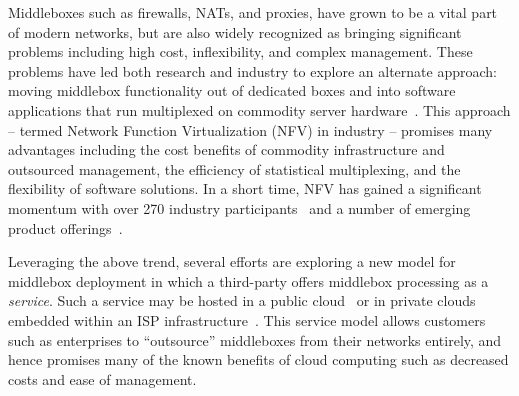 





Middleboxes such as firewalls, NATs, and proxies, have grown to be a vital part of modern networks, but are 
also widely recognized as bringing significant problems including high cost, inflexibility, and complex management.  
These problems have led both research and industry to explore an alternate approach: moving middlebox functionality out of dedicated boxes and into 
software applications that run multiplexed on commodity server hardware~\cite{mb-manifesto,comb,aplomb,opennf,clickos,flowtags,etsi-nfv,domain20,opnfv}.
This approach -- termed Network Function Virtualization (NFV) in industry -- promises many advantages including the cost benefits of commodity infrastructure and outsourced management, 
the efficiency of statistical multiplexing, and the flexibility of software solutions. 
In a short time, NFV has gained a significant momentum with over 270 industry participants~\cite{etsi-nfv} and a number of emerging product offerings~\cite{brocade,dell,juniper}.

Leveraging the above trend, several efforts are exploring a new model for middlebox deployment in which a third-party offers middlebox processing as a  
\emph{service}.
Such a service may be hosted in a public cloud~\cite{aplomb,zscaler,aryaka} or in private clouds embedded within an ISP 
infrastructure~\cite{domain20, telefonica}.  
This service model allows customers such as enterprises to ``outsource'' middleboxes from their networks entirely, and hence promises many of the known benefits of cloud computing  such as decreased costs and ease of management.%

